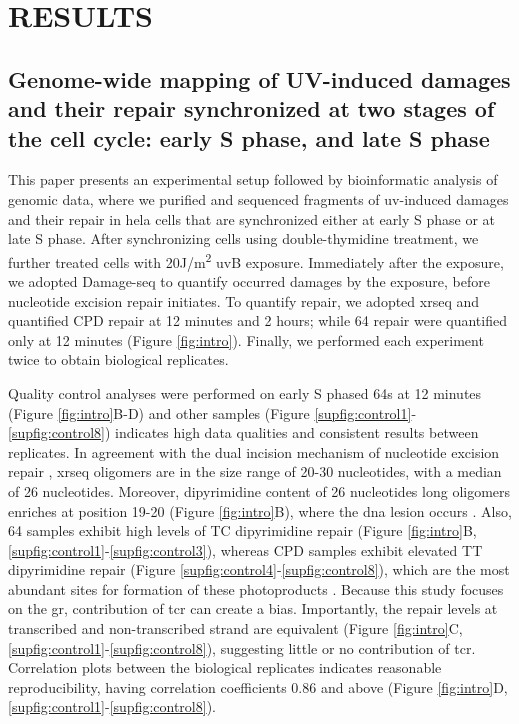 \setlength{\parindent}{0pt}
\chapter{\bf RESULTS}

\section{Genome-wide mapping of UV-induced damages and their repair synchronized at two stages of the cell cycle: early S phase, and late S phase}

This paper presents an experimental setup followed by bioinformatic analysis of genomic data, where we purified and sequenced fragments of \gls{uv}-induced damages and their repair in \gls{hela} cells that are synchronized either at early S phase or at late S phase. After synchronizing cells using double-thymidine treatment, we further treated cells with 20J/m\textsuperscript{2} \gls{uv}B exposure. Immediately after the exposure, we adopted Damage-seq to quantify occurred damages by the exposure, before nucleotide excision repair initiates. To quantify repair, we adopted \gls{xrseq} and quantified \gls{CPD} repair at 12 minutes and 2 hours; while \gls{64} repair were quantified only at 12 minutes (Figure \ref{fig:intro}). Finally, we performed each experiment twice to obtain biological replicates. 

Quality control analyses were performed on early S phased \gls{64}s at 12 minutes (Figure \ref{fig:intro}B-D) and other samples (Figure \ref{supfig:control1}-\ref{supfig:control8}) indicates high data qualities and consistent results between replicates. In agreement with the dual incision mechanism of nucleotide excision repair \citep{huang1992human,li2017human,reardon2005nucleotide}, \gls{xrseq} oligomers are in the size range of 20-30 nucleotides, with a median of 26 nucleotides. Moreover, dipyrimidine content of 26 nucleotides long oligomers enriches at position 19-20 (Figure \ref{fig:intro}B), where the \gls{dna} lesion occurs \citep{huang1992human}. Also, \gls{64} samples exhibit high levels of \gls{T}\gls{C} dipyrimidine repair (Figure \ref{fig:intro}B, \ref{supfig:control1}-\ref{supfig:control3}), whereas \gls{CPD} samples exhibit elevated \gls{T}\gls{T} dipyrimidine repair (Figure \ref{supfig:control4}-\ref{supfig:control8}), which are the most abundant sites for formation of these photoproducts \citep{mouret2010uva}. Because this study focuses on the \gls{gr}, contribution of \gls{tcr} can create a bias. Importantly, the repair levels at transcribed and non-transcribed strand are equivalent (Figure \ref{fig:intro}C, \ref{supfig:control1}-\ref{supfig:control8}), suggesting little or no contribution of \gls{tcr}. Correlation plots between the biological replicates indicates reasonable reproducibility, having correlation coefficients 0.86 and above (Figure \ref{fig:intro}D, \ref{supfig:control1}-\ref{supfig:control8}). 


